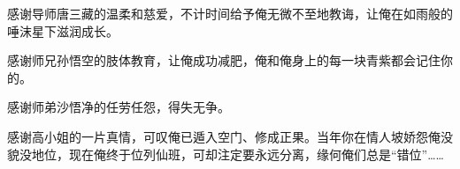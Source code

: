 \begin{thanks}
感谢导师唐三藏的温柔和慈爱，不计时间给予俺无微不至地教诲，让俺在如雨般的唾沫星下滋润成长。

感谢师兄孙悟空的肢体教育，让俺成功减肥，俺和俺身上的每一块青紫都会记住你的。

感谢师弟沙悟净的任劳任怨，得失无争。

感谢高小姐的一片真情，可叹俺已遁入空门、修成正果。当年你在情人坡娇怨俺没貌没地位，现在俺终于位列仙班，可却注定要永远分离，缘何俺们总是“错位”……

\begin{flushright}
{}

\end{flushright}

\end{thanks}
